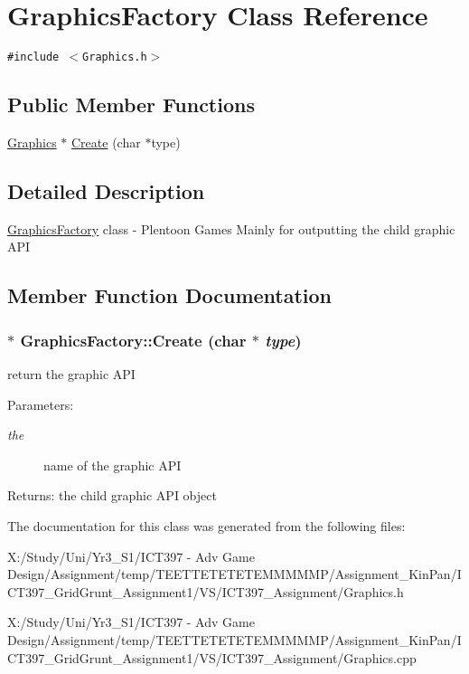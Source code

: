 \hypertarget{class_graphics_factory}{
\section{GraphicsFactory Class Reference}
\label{class_graphics_factory}
}
{\tt \#include $<$Graphics.h$>$}

\subsection*{Public Member Functions}
\begin{CompactItemize}
\item 
\hyperlink{class_graphics}{Graphics} $\ast$ \hyperlink{class_graphics_factory_be3e5a57b257f6d7a7d672907c92a939}{Create} (char $\ast$type)
\end{CompactItemize}


\subsection{Detailed Description}
\hyperlink{class_graphics_factory}{GraphicsFactory} class - Plentoon Games Mainly for outputting the child graphic API 

\subsection{Member Function Documentation}
\hypertarget{class_graphics_factory_be3e5a57b257f6d7a7d672907c92a939}{
\subsubsection[Create]{ $\ast$ GraphicsFactory::Create (char $\ast$ {\em type})}}
\label{class_graphics_factory_be3e5a57b257f6d7a7d672907c92a939}


return the graphic API \begin{Desc}
\item[Parameters:]
\begin{description}
\item[{\em the}]name of the graphic API \end{description}
\end{Desc}
\begin{Desc}
\item[Returns:]the child graphic API object \end{Desc}


The documentation for this class was generated from the following files:\begin{CompactItemize}
\item 
X:/Study/Uni/Yr3\_\-S1/ICT397 - Adv Game Design/Assignment/temp/TEETTETETETEMMMMMP/Assignment\_\-KinPan/ICT397\_\-GridGrunt\_\-Assignment1/VS/ICT397\_\-Assignment/Graphics.h\item 
X:/Study/Uni/Yr3\_\-S1/ICT397 - Adv Game Design/Assignment/temp/TEETTETETETEMMMMMP/Assignment\_\-KinPan/ICT397\_\-GridGrunt\_\-Assignment1/VS/ICT397\_\-Assignment/Graphics.cpp\end{CompactItemize}
